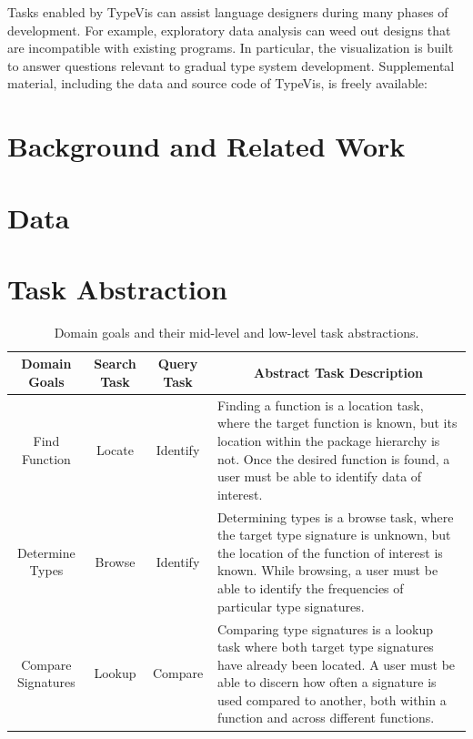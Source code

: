 \documentclass{vgtc}                          %
\begin{document}
Tasks enabled by {\sc TypeVis} can assist language designers
during many phases of development.
For example, exploratory data analysis can weed out designs that
are incompatible with existing programs.
In particular, the visualization is built to answer questions
relevant to gradual type system development.
Supplemental material, including the data and source code of
{\sc TypeVis}, is freely available: 


\section{Background and Related Work}



\section{Data}



\section{Task Abstraction}

\bgroup
\def\arraystretch{1.75}
\begin{table}
  \centering
  \begin{tabularx}{\linewidth}{c|c|c|X}
    Domain Goals & Search Task & Query Task & \multicolumn{1}{c}{Abstract Task Description} \\
    \hline
    Find Function & Locate & Identify & Finding a function is a location task, where the target function is known, but its location within the package hierarchy is not. Once the desired function is found, a user must be able to identify data of interest. \\

    Determine Types & Browse & Identify & Determining types is a browse task, where the target type signature is unknown, but the location of the function of interest is known. While browsing, a user must be able to identify the frequencies of particular type signatures.\\

    Compare Signatures & Lookup & Compare & Comparing type signatures is a lookup task where both target type signatures have already been located. A user must be able to discern how often a signature is used compared to another, both within a function and across different functions.\\
  \end{tabularx}
  \caption{Domain goals and their mid-level and low-level task abstractions.}
  \label{tab:tasks}
\end{table}
\egroup
\end{document}
